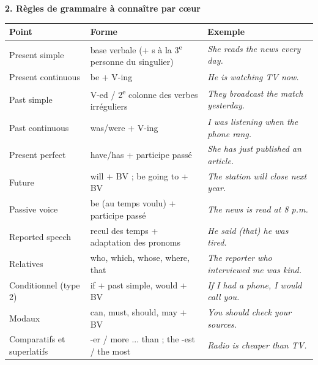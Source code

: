 \documentclass[11pt]{article}
\newcommand{\eng}[1]{\ifmmode\text{\textit{#1}}\else\begingroup\selectlanguage{english}\itshape #1\endgroup\fi}
\begin{document}
\begin{propriete}
\textbf{2. Règles de grammaire à connaître par cœur}
\begin{center}
\begin{tabularx}{\linewidth}{|l|X|X|}\hline
\rowcolor{popblueL} \textbf{Point} & \textbf{Forme} & \textbf{Exemple} \\ \hline
Present simple & base verbale (+ s à la 3\textsuperscript{e} personne du singulier) & \eng{She reads the news every day.} \\ \hline
Present continuous & be + V-ing & \eng{He is watching TV now.} \\ \hline
Past simple & V-ed / 2\textsuperscript{e} colonne des verbes irréguliers & \eng{They broadcast the match yesterday.} \\ \hline
Past continuous & was/were + V-ing & \eng{I was listening when the phone rang.} \\ \hline
Present perfect & have/has + participe passé & \eng{She has just published an article.} \\ \hline
Future & will + BV ; be going to + BV & \eng{The station will close next year.} \\ \hline
Passive voice & be (au temps voulu) + participe passé & \eng{The news is read at 8 p.m.} \\ \hline
Reported speech & recul des temps + adaptation des pronoms & \eng{He said (that) he was tired.} \\ \hline
Relatives & who, which, whose, where, that & \eng{The reporter who interviewed me was kind.} \\ \hline
Conditionnel (type 2) & if + past simple, would + BV & \eng{If I had a phone, I would call you.} \\ \hline
Modaux & can, must, should, may + BV & \eng{You should check your sources.} \\ \hline
Comparatifs et superlatifs & -er / more ... than ; the -est / the most & \eng{Radio is cheaper than TV.} \\ \hline
\end{tabularx}
\end{center}


\end{propriete}
\end{document}
